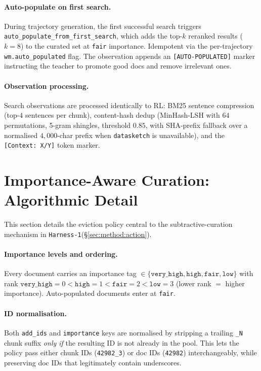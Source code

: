 \documentclass{article}
\newcommand{\sys}{\texttt{Harness-1}\xspace}
\begin{document}
\paragraph{Auto-populate on first search.}
During trajectory generation, the first successful search
triggers \texttt{auto\_populate\_from\_first\_search}, which adds
the top-$k$ reranked results ($k{=}8$) to the curated set at
\texttt{fair} importance. Idempotent via the per-trajectory
\texttt{wm.auto\_populated} flag. The observation appends an
\texttt{[AUTO-POPULATED]} marker instructing the teacher to
promote good docs and remove irrelevant ones.

\paragraph{Observation processing.} Search observations are
processed identically to RL: BM25 sentence compression
(top-$4$ sentences per chunk), content-hash dedup (MinHash-LSH
with $64$ permutations, 5-gram shingles, threshold $0.85$, with
SHA-prefix fallback over a normalised $4{,}000$-char prefix when
\texttt{datasketch} is unavailable), and the
\texttt{[Context: X/Y]} token marker.

\section{Importance-Aware Curation: Algorithmic Detail}
\label{app:importance}

This section details the eviction policy central to the
subtractive-curation mechanism in \sys (§\ref{sec:method:action}).

\paragraph{Importance levels and ordering.}
Every document carries an importance tag $\in
\{\texttt{very\_high}, \texttt{high}, \texttt{fair},
\texttt{low}\}$ with rank $\texttt{very\_high}{=}0 <
\texttt{high}{=}1 < \texttt{fair}{=}2 < \texttt{low}{=}3$ (lower
rank $=$ higher importance). Auto-populated documents enter at
\texttt{fair}.

\paragraph{ID normalisation.} Both \texttt{add\_ids} and
\texttt{importance} keys are normalised by stripping a trailing
\texttt{\_N} chunk suffix \emph{only if} the resulting ID is not
already in the pool. This lets the policy pass either chunk IDs
(\texttt{42982\_3}) or doc IDs (\texttt{42982}) interchangeably,
while preserving doc IDs that legitimately contain underscores.
\end{document}
